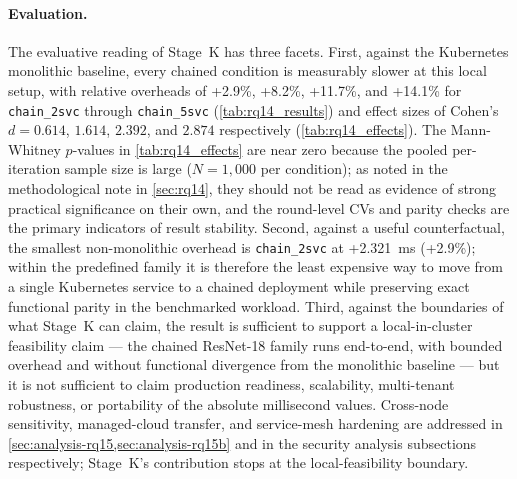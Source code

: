 \paragraph{Evaluation.}
The evaluative reading of Stage~K has three facets. First, against the
Kubernetes monolithic baseline, every chained condition is measurably
slower at this local setup, with relative overheads of +2.9\%,
+8.2\%, +11.7\%, and +14.1\% for \texttt{chain\_2svc} through
\texttt{chain\_5svc} (\cref{tab:rq14_results}) and effect sizes of
Cohen's \(d=0.614\), \(1.614\), \(2.392\), and \(2.874\) respectively
(\cref{tab:rq14_effects}). The Mann-Whitney \(p\)-values in
\cref{tab:rq14_effects} are near zero because the pooled
per-iteration sample size is large (\(N=1{,}000\) per condition); as
noted in the methodological note in \cref{sec:rq14}, they should not
be read as evidence of strong practical significance on their own,
and the round-level CVs and parity checks are the primary indicators
of result stability. Second, against a useful counterfactual, the
smallest non-monolithic overhead is \texttt{chain\_2svc} at
+2.321~ms (+2.9\%); within the predefined family it is therefore the
least expensive way to move from a single Kubernetes service to a
chained deployment while preserving exact functional parity in the
benchmarked workload. Third, against the boundaries of what Stage~K
can claim, the result is sufficient to support a local-in-cluster
feasibility claim --- the chained ResNet-18 family runs end-to-end,
with bounded overhead and without functional divergence from the
monolithic baseline --- but it is not sufficient to claim production
readiness, scalability, multi-tenant robustness, or portability of
the absolute millisecond values. Cross-node sensitivity,
managed-cloud transfer, and service-mesh hardening are addressed in
\cref{sec:analysis-rq15,sec:analysis-rq15b} and in the security
analysis subsections respectively; Stage~K's contribution stops at the
local-feasibility boundary.

